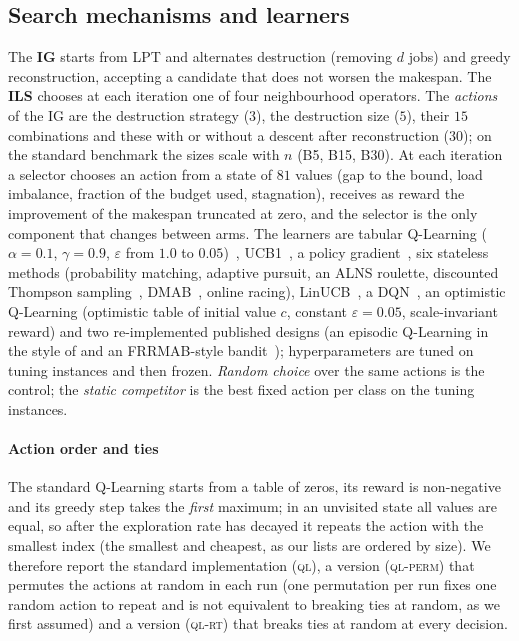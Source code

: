 \subsection{Search mechanisms and learners}
\label{sec:learners}
The \textbf{IG} starts from LPT and alternates destruction (removing $d$ jobs) and greedy reconstruction, accepting a candidate that does not worsen the makespan. The \textbf{ILS} chooses at each iteration one of four neighbourhood operators. The \emph{actions} of the IG are the destruction strategy ($3$), the destruction size ($5$), their $15$ combinations and these with or without a descent after reconstruction ($30$); on the standard benchmark the sizes scale with $n$ (B5, B15, B30). At each iteration a selector chooses an action from a state of $81$ values (gap to the bound, load imbalance, fraction of the budget used, stagnation), receives as reward the improvement of the makespan truncated at zero, and the selector is the only component that changes between arms. The learners are tabular Q-Learning ($\alpha=0.1$, $\gamma=0.9$, $\varepsilon$ from $1.0$ to $0.05$)~\cite{WatkinsDayan1992}, UCB1~\cite{AuerEtal2002}, a policy gradient~\cite{Williams1992}, six stateless methods (probability matching, adaptive pursuit, an ALNS roulette, discounted Thompson sampling~\cite{Russo2018}, DMAB~\cite{DaCostaEtal2008}, online racing), LinUCB~\cite{LiEtAl2010}, a DQN~\cite{MnihEtAl2015}, an optimistic Q-Learning (optimistic table of initial value $c$, constant $\varepsilon=0.05$, scale-invariant reward) and two re-implemented published designs (an episodic Q-Learning in the style of \citet{KarimiMamaghanEtal2023} and an FRRMAB-style bandit~\cite{LiFialhoEtal2014}); hyperparameters are tuned on tuning instances and then frozen. \emph{Random choice} over the same actions is the control; the \emph{static competitor} is the best fixed action per class on the tuning instances.

\paragraph{Action order and ties} The standard Q-Learning starts from a table of zeros, its reward is non-negative and its greedy step takes the \emph{first} maximum; in an unvisited state all values are equal, so after the exploration rate has decayed it repeats the action with the smallest index (the smallest and cheapest, as our lists are ordered by size). We therefore report the standard implementation (\textsc{ql}), a version (\textsc{ql-perm}) that permutes the actions at random in each run (one permutation per run fixes one random action to repeat and is not equivalent to breaking ties at random, as we first assumed) and a version (\textsc{ql-rt}) that breaks ties at random at every decision.

